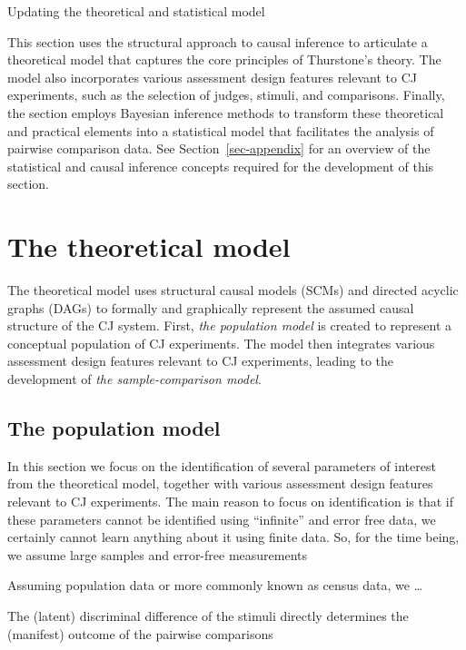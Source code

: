 \documentclass[
  authoryear,
  review,
  1p]{elsarticle}
\begin{document}
Updating the theoretical and statistical model

This section uses the structural approach to causal inference
\citep{Pearl_2009, Pearl_et_al_2016} to articulate a theoretical model
that captures the core principles of Thurstone's theory. The model also
incorporates various assessment design features relevant to CJ
experiments, such as the selection of judges, stimuli, and comparisons.
Finally, the section employs Bayesian inference methods to transform
these theoretical and practical elements into a statistical model that
facilitates the analysis of pairwise comparison data. See
Section~\ref{sec-appendix} for an overview of the statistical and causal
inference concepts required for the development of this section.

\section{The theoretical model}\label{sec-theory-theoretical}

The theoretical model uses structural causal models (SCMs) and directed
acyclic graphs (DAGs)
\citep{Pearl_2009, Pearl_et_al_2016, Gross_et_al_2018, Neal_2020} to
formally and graphically represent the assumed causal structure of the
CJ system. First, \emph{the population model} is created to represent a
conceptual population of CJ experiments. The model then integrates
various assessment design features relevant to CJ experiments, leading
to the development of \emph{the sample-comparison model}.

\subsection{The population model}\label{sec-theory-theoretical_P}

In this section we focus on the identification of several parameters of
interest from the theoretical model, together with various assessment
design features relevant to CJ experiments. The main reason to focus on
identification is that if these parameters cannot be identified using
``infinite'' and error free data, we certainly cannot learn anything
about it using finite data. So, for the time being, we assume large
samples and error-free measurements \citep[pp.~5]{Schuessler_et_al_2023}

Assuming population data or more commonly known as census data, we
\ldots{}

The (latent) discriminal difference of the stimuli directly determines
the (manifest) outcome of the pairwise comparisons
\end{document}
